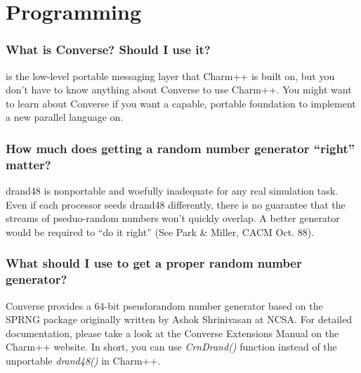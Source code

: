 \section{\converse{} Programming}

\subsubsection{What is Converse? Should I use it?}

is the low-level portable messaging layer that Charm++ is built on, but
you don't have to know anything about Converse to use Charm++. You might
want to learn about Converse if you want a capable, portable foundation
to implement a new parallel language on.

\subsubsection{How much does getting a random number generator ``right'' matter?}

drand48 is nonportable and woefully inadequate for any real simulation
task. Even if each processor seeds drand48 differently, there is no guarantee
that the streams of pseduo-random numbers won't quickly overlap. A better
generator would be required to ``do it right'' (See Park \& Miller, CACM
Oct. 88).

\subsubsection{What should I use to get a proper random number generator?}

Converse provides a 64-bit pseudorandom number generator based on the
SPRNG package originally written by Ashok Shrinivasan at NCSA. For detailed
documentation, please take a look at the Converse Extensions Manual on
the Charm++ website. In short, you can use {\em CrnDrand()} function
instead of the unportable {\em drand48()} in Charm++.
